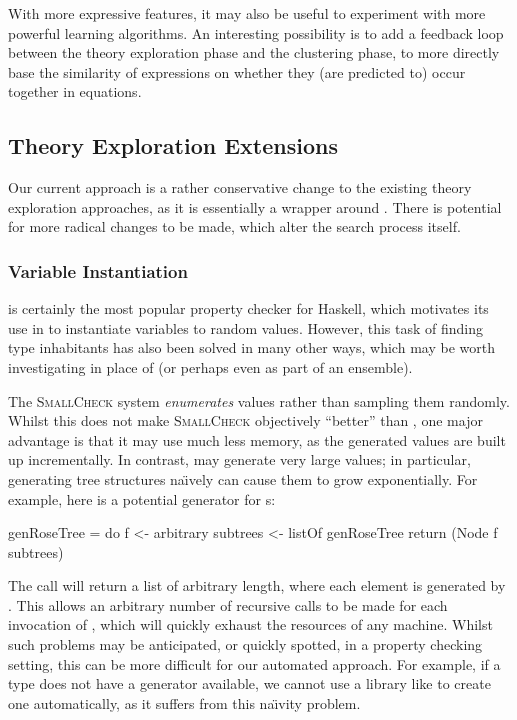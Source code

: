 With more expressive features, it may also be useful to experiment with more powerful learning algorithms. An interesting possibility is to add a feedback loop between the theory exploration phase and the clustering phase, to more directly base the similarity of expressions on whether they (are predicted to) occur together in equations.

\subsection{Theory Exploration Extensions}

Our current approach is a rather conservative change to the existing theory exploration approaches, as it is essentially a wrapper around \qspec{}. There is potential for more radical changes to be made, which alter the search process itself.

\subsubsection{Variable Instantiation}

\qcheck{} is certainly the most popular property checker for Haskell, which motivates its use in \qspec{} to instantiate variables to random values. However, this task of finding type inhabitants has also been solved in many other ways, which may be worth investigating in place of \qcheck{} (or perhaps even as part of an ensemble).

The \textsc{SmallCheck} system \cite{runciman2008smallcheck} \emph{enumerates} values rather than sampling them randomly. Whilst this does not make \textsc{SmallCheck} objectively ``better'' than \qcheck{}, one major advantage is that it may use much less memory, as the generated values are built up incrementally. In contrast, \qcheck{} may generate very large values; in particular, generating tree structures na\"{\i}vely can cause them to grow exponentially. For example, here is a potential generator for s:

\begin{haskell}
genRoseTree = do f        <- arbitrary
                 subtrees <- listOf genRoseTree
                 return (Node f subtrees)
\end{haskell}

The  call will return a list of arbitrary length, where each element is generated by . This allows an arbitrary number of recursive calls to be made for each invocation of , which will quickly exhaust the resources of any machine. Whilst such problems may be anticipated, or quickly spotted, in a property checking setting, this can be more difficult for our automated approach. For example, if a type does not have a generator available, we cannot use a library like  to create one automatically, as it suffers from this na\"{\i}vity problem.

